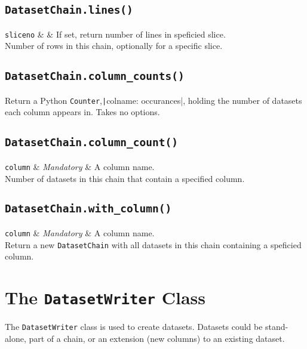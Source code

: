\subsection{\texttt{DatasetChain.lines()}}
\starttable
\texttt{sliceno} & \pyNone & If set, return number of lines in speficied slice.\\
\stoptable
Number of rows in this chain, optionally for a specific slice.


\subsection{\texttt{DatasetChain.column\_counts()}}
Return a Python \texttt{Counter},\texttt|{colname:
occurances}|, holding the number of datasets each column appears in.
Takes no options.


\subsection{\texttt{DatasetChain.column\_count()}}
\starttable
\texttt{column} & \textsl{Mandatory} & A column name.\\
\stoptable
Number of datasets in this chain that contain a specified column.


\subsection{\texttt{DatasetChain.with\_column()}}
\starttable
\texttt{column} & \textsl{Mandatory} & A column name.\\
\stoptable
Return a new \texttt{DatasetChain} with all datasets in this chain
containing a speficied column.



\clearpage
\section{The \texttt{DatasetWriter} Class}
The \texttt{DatasetWriter} class is used to create datasets.  Datasets
could be stand-alone, part of a chain, or an extension (new columns)
to an existing dataset.

